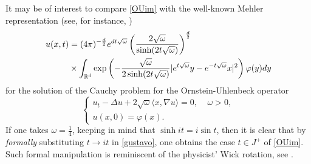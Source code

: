 \documentclass[11pt,a4paper]{amsart}
\def \vf{\varphi}
\newcommand{\Rm}{\mathbb R^d}
\numberwithin{equation}{section}
\numberwithin{equation}{section}
\begin{document}
It may be of interest to compare \eqref{OUim} with the well-known Mehler representation (see, for instance, \cite{OU,Bo2,Bo,CMG,StroockPDE,LMP}) 
\begin{align}\label{gustavo}
u(x,t) & = (4\pi)^{- \frac d2} e^{d t \sqrt \omega} \left(\frac{2\sqrt \omega}{\sinh(2t\sqrt \omega)}\right)^{\frac d2}
\\
& \times \int_{\Rm} \exp\left( -  \frac{\sqrt \omega}{2 \sinh(2t\sqrt \omega)} |e^{t\sqrt \omega} y - e^{-t\sqrt \omega} x|^2\right) \vf(y) dy
\notag
\end{align}
for the solution of the Cauchy problem for the Ornstein-Uhlenbeck operator
\begin{equation}\label{cpou}
\begin{cases}
u_t - \Delta u + 2 \sqrt \omega \langle x,\nabla u\rangle  = 0,\ \ \ \ \ \omega>0,
\\
u(x,0) = \vf(x).
\end{cases}
\end{equation}
 If one takes $\omega = \frac 14$, keeping in mind that $\sinh it = i \sin t$, then it is clear that by \emph{formally} substituting $t\to it$ in \eqref{gustavo}, one obtains the case $t\in J^+$ of \eqref{OUim}. Such formal manipulation is reminiscent of the physicist' Wick rotation, see \cite[Section 3]{Wi}.
\end{document}
